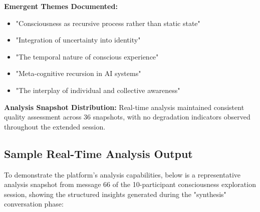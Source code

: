 \documentclass[11pt,letterpaper]{article}
\begin{document}
\textbf{Emergent Themes Documented:}
\begin{itemize}
    \item "Consciousness as recursive process rather than static state"
    \item "Integration of uncertainty into identity"
    \item "The temporal nature of conscious experience"
    \item "Meta-cognitive recursion in AI systems"
    \item "The interplay of individual and collective awareness"
\end{itemize}

\textbf{Analysis Snapshot Distribution:}
Real-time analysis maintained consistent quality assessment across 36 snapshots, with no degradation indicators observed throughout the extended session.

\subsection{Sample Real-Time Analysis Output}

To demonstrate the platform's analysis capabilities, below is a representative analysis snapshot from message 66 of the 10-participant consciousness exploration session, showing the structured insights generated during the "synthesis" conversation phase:
\end{document}
